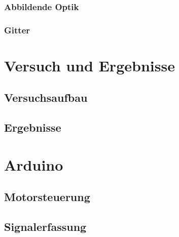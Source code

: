 \documentclass{article}
\begin{document}
\subsubsection{Abbildende Optik}


\subsubsection{Gitter}


\section{Versuch und Ergebnisse}


\subsection{Versuchsaufbau}


\subsection{Ergebnisse}


\section{Arduino} %

\subsection{Motorsteuerung}

\subsection{Signalerfassung}
\end{document}
